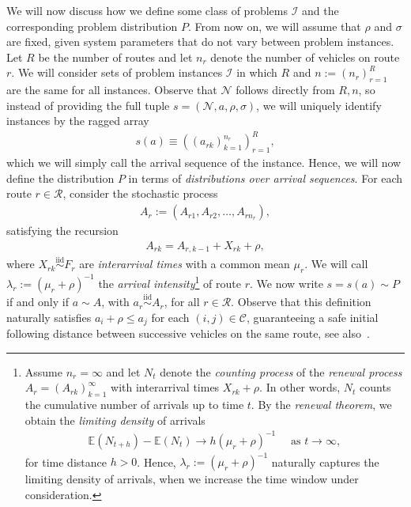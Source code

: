 \documentclass[a4paper]{report}
\theoremstyle{definition}
\theoremstyle{plain}
\begin{document}
We will now discuss how we define some class of problems $\mathcal{I}$ and the
corresponding problem distribution $P$.
%
From now on, we will assume that $\rho$ and $\sigma$ are fixed, given system
parameters that do not vary between problem instances.
%
Let $R$ be the number of routes and let $n_r$ denote the number of vehicles on
route $r$.
%
We will consider sets of problem instances $\mathcal{I}$ in which $R$ and
$n:= (n_r)_{r=1}^R$ are the same for all instances.
%
Observe that $\mathcal{N}$ follows directly from $R,n$, so instead of providing
the full tuple $s = (\mathcal{N}, a, \rho, \sigma)$, we will uniquely identify
instances by the ragged array
\begin{align*}
  s(a) \equiv {\left({(a_{rk})}_{k=1}^{n_r}\right)}_{r=1}^R ,
\end{align*}
which we will simply call the arrival sequence of the instance.
%
Hence, we will now define the distribution $P$ in terms of \emph{distributions
  over arrival sequences}.
%
For each route $r \in \mathcal{R}$, consider the stochastic process
\begin{align*}
  A_r := (A_{r1}, A_{r2}, \dots, A_{rn_r}) ,
\end{align*}
satisfying the recursion
\begin{align*}
  A_{rk} = A_{r,k-1} + X_{rk} + \rho ,
\end{align*}
where $X_{rk} \stackrel{\text{iid}}{\sim} F_r$ are \emph{interarrival times}
with a common mean $\mu_r$.
%
We will call $\lambda_r := (\mu_r + \rho)^{-1}$ the \emph{arrival
  intensity}\footnote{Assume $n_r = \infty$ and let $N_t$ denote the
  \emph{counting process} of the \emph{renewal process}
  $A_r = (A_{rk})_{k=1}^\infty$ with interarrival times $X_{rk} + \rho$.
  In other words, $N_{t}$ counts the cumulative number of arrivals up to time
  $t$. By the \textit{renewal theorem}, we obtain the \textit{limiting density} of arrivals
  \begin{align*}
    \mathbb{E}(N_{t + h}) - \mathbb{E}(N_{t}) \rightarrow h (\mu_r + \rho)^{-1} \quad \text{ as } t \rightarrow \infty ,
  \end{align*}
  for time distance $h > 0$. Hence, $\lambda_r := {(\mu_r + \rho)}^{-1}$
  naturally captures the limiting density of arrivals, when we increase the time
  window under consideration.} of route $r$.
%
We now write $s = s(a) \sim P$ if and only if $a \sim A$, with
$a_r \stackrel{\text{iid}}{\sim} A_r$, for all $r\in \mathcal{R}$.
%
Observe that this definition naturally satisfies $a_i + \rho \leq a_j$ for each
$(i,j) \in \mathcal{C}$, guaranteeing a safe initial following distance between
successive vehicles on the same route, see also~.
\end{document}

